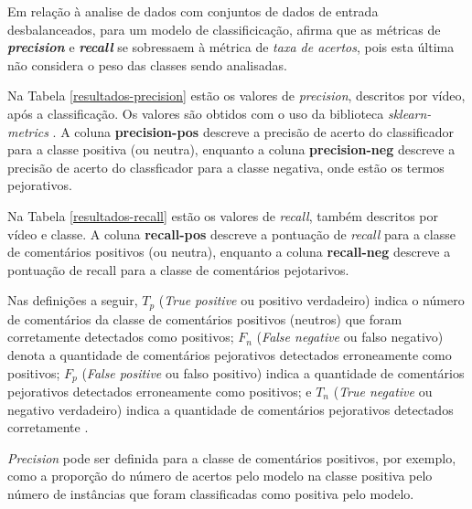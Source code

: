 Em relação à analise de dados com conjuntos de dados de entrada desbalanceados, para um modelo de classificicação,  afirma que as métricas de \textbf{\textit{precision}} e \textbf{\textit{recall}} se sobressaem à métrica de \textit{taxa de acertos}, pois esta última não considera o peso das classes sendo analisadas.

Na Tabela \ref{resultados-precision} estão os valores de \textit{precision}, descritos por vídeo, após a classificação. Os valores são obtidos com o uso da biblioteca \textit{sklearn-metrics} \cite{scikit-learn}. A coluna \textbf{precision-pos} descreve a precisão de acerto do classificador para a classe positiva (ou neutra), enquanto a coluna \textbf{precision-neg} descreve a precisão de acerto do classficador para a classe negativa, onde estão os termos pejorativos.

Na Tabela \ref{resultados-recall} estão os valores de \textit{recall}, também descritos por vídeo e classe. A coluna \textbf{recall-pos} descreve a pontuação de \textit{recall} para a classe de comentários positivos (ou neutra), enquanto a coluna \textbf{recall-neg} descreve a pontuação de recall para a classe de comentários pejotarivos.





Nas definições a seguir, $T_p$ (\textit{True positive} ou positivo verdadeiro) indica o número de comentários da classe de comentários positivos (neutros) que foram corretamente detectados como positivos; $F_n$ (\textit{False negative} ou falso negativo) denota a quantidade de comentários pejorativos detectados erroneamente como positivos; $F_p$ (\textit{False positive} ou falso positivo) indica a quantidade de comentários pejorativos detectados erroneamente como positivos; e $T_n$ (\textit{True negative} ou negativo verdadeiro) indica a quantidade de comentários pejorativos detectados corretamente \cite{tan2009DataMining}.

\textit{Precision} pode ser definida para a classe de comentários positivos, por exemplo, como a proporção do número de acertos pelo modelo na classe positiva pelo número de instâncias que foram classificadas como positiva pelo modelo. 

